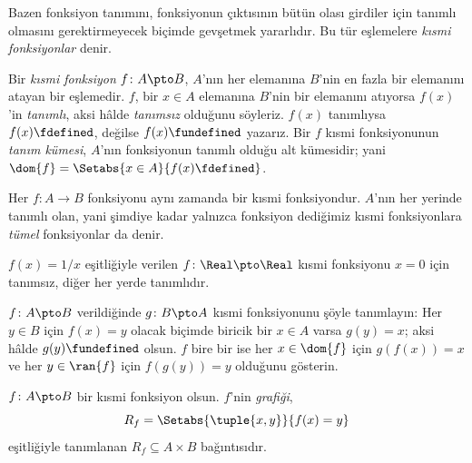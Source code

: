 



\begin{explain}
Bazen fonksiyon tanımını, fonksiyonun çıktısının bütün olası girdiler için
tanımlı olmasını gerektirmeyecek biçimde gevşetmek yararlıdır. Bu tür
eşlemelere \emph{kısmi fonksiyonlar} denir.
\end{explain}

\begin{defn}
Bir \emph{kısmi fonksiyon} $f \colon A \pto B$, $A$'nın her elemanına
$B$'nin en fazla bir elemanını atayan bir eşlemedir. $f$, bir $x \in A$
elemanına $B$'nin bir elemanını atıyorsa $f(x)$'in \emph{tanımlı}, aksi
hâlde \emph{tanımsız} olduğunu söyleriz. $f(x)$ tanımlıysa
$f(x) \fdefined$, değilse $f(x) \fundefined$ yazarız. Bir $f$ kısmi
fonksiyonunun \emph{tanım kümesi}, $A$'nın fonksiyonun tanımlı olduğu alt
kümesidir; yani $\dom{f} = \Setabs{x \in A}{f(x) \fdefined}$.
\end{defn}

\begin{ex}
Her $f\colon A \to B$ fonksiyonu aynı zamanda bir kısmi fonksiyondur.
$A$'nın her yerinde tanımlı olan, yani şimdiye kadar yalnızca fonksiyon
dediğimiz kısmi fonksiyonlara \emph{tümel} fonksiyonlar da denir.
\end{ex}

\begin{ex}
$f(x)=1/x$ eşitliğiyle verilen $f \colon \Real \pto \Real$ kısmi fonksiyonu
$x=0$ için tanımsız, diğer her yerde tanımlıdır.
\end{ex}

\begin{prob}
$f\colon A \pto B$ verildiğinde $g\colon B \pto A$ kısmi fonksiyonunu şöyle
tanımlayın: Her $y \in B$ için $f(x)=y$ olacak biçimde biricik bir
$x \in A$ varsa $g(y)=x$; aksi hâlde $g(y) \fundefined$ olsun. $f$ bire bir ise
her $x \in \dom{f}$ için $g(f(x))=x$ ve her $y \in \ran{f}$ için
$f(g(y))=y$ olduğunu gösterin.
\end{prob}

\begin{defn}
$f\colon A \pto B$ bir kısmi fonksiyon olsun. $f$'nin \emph{grafiği},
\[
R_f = \Setabs{\tuple{x,y}}{f(x) = y}
\]
eşitliğiyle tanımlanan $R_f \subseteq A \times B$ bağıntısıdır.
\end{defn}


